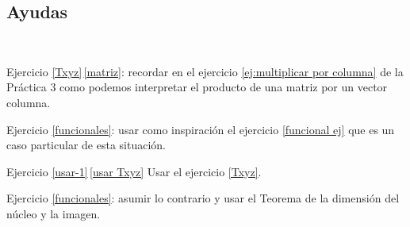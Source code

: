 \subsection*{Ayudas}

\

    Ejercicio \ref{Txyz}\,\ref{matriz}: recordar en el ejercicio \ref{ej:multiplicar por columna} de la Práctica 3 como podemos interpretar el producto de una matriz por un vector columna. 

    Ejercicio \ref{funcionales}: usar como inspiración el ejercicio \ref{funcional ej} que es un caso particular de esta situación.

    Ejercicio \ref{usar-1}\,\ref{usar Txyz} Usar el ejercicio \ref{Txyz}.

    Ejercicio \ref{funcionales}: asumir lo contrario y usar el Teorema de la dimensión del núcleo y la imagen.

